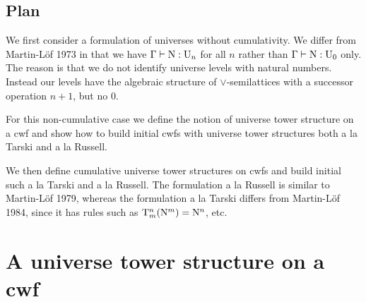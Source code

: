 \documentclass{lmcs}
\newcommand{\Ta}{\mathrm{T}}
\begin{document}
\subsection*{Plan}

We first consider a formulation of universes without cumulativity. We differ from Martin-Löf 1973 in that we have $\Gamma \vdash \mathrm{N} : \mathrm{U}_n$ for all $n$ rather than $\Gamma \vdash \mathrm{N} : \mathrm{U}_0$ only. The reason is that we do not identify universe levels with natural numbers. Instead our levels have the algebraic structure of $\vee$-semilattices with a successor operation $n+1$, but no $0$.

For this non-cumulative case we define the notion of universe tower structure on a cwf and show how to build initial cwfs with universe tower structures both a la Tarski and a la Russell. 

We then define cumulative universe tower structures on cwfs and build initial such a la Tarski and a la Russell. The formulation a la Russell is similar to Martin-Löf 1979, whereas the formulation a la Tarski differs from Martin-Löf 1984, since it has rules such as $\Ta_m^n(\N^m) = \N^n$, etc.

\section{A universe tower structure on a cwf}
\end{document}
